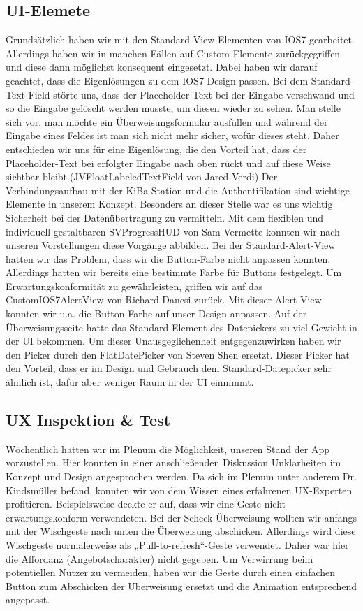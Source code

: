 \subsection{UI-Elemete}
	Grundsätzlich haben wir mit den Standard-View-Elementen von IOS7 gearbeitet. Allerdings haben wir in manchen Fällen auf Custom-Elemente zurückgegriffen und diese dann möglichst konsequent eingesetzt. Dabei haben wir darauf geachtet, dass die Eigenlösungen zu dem IOS7 Design passen. Bei dem Standard-Text-Field störte uns, dass der Placeholder-Text bei der Eingabe verschwand und so die Eingabe gelöscht werden musste, um diesen wieder zu sehen. Man stelle sich vor, man möchte ein Überweisungsformular ausfüllen und während der Eingabe eines Feldes ist man sich nicht mehr sicher, wofür dieses steht. Daher entschieden wir uns für eine Eigenlösung, die den Vorteil hat, dass der Placeholder-Text bei erfolgter Eingabe nach oben rückt und auf diese Weise sichtbar bleibt.(JVFloatLabeledTextField von Jared Verdi)
Der Verbindungsaufbau mit der KiBa-Station und die Authentifikation sind wichtige Elemente in unserem Konzept. Besonders an dieser Stelle war es uns wichtig Sicherheit bei der Datenübertragung zu vermitteln. Mit dem flexiblen und individuell gestaltbaren SVProgressHUD von Sam Vermette konnten wir nach unseren Vorstellungen diese Vorgänge abbilden.
Bei der Standard-Alert-View hatten wir das Problem, dass wir die Button-Farbe nicht anpassen konnten. Allerdings hatten wir bereits eine bestimmte Farbe für Buttons festgelegt. Um Erwartungskonformität zu gewährleisten, griffen wir auf das CustomIOS7AlertView von Richard Dancsi zurück. Mit dieser Alert-View konnten wir u.a. die Button-Farbe auf unser Design anpassen.
Auf der Überweisungsseite hatte das Standard-Element des Datepickers zu viel Gewicht in der UI bekommen. Um dieser Unausgeglichenheit entgegenzuwirken haben wir den Picker durch den FlatDatePicker von Steven Shen ersetzt. Dieser Picker hat den Vorteil, dass er im Design und Gebrauch dem Standard-Datepicker sehr ähnlich ist, dafür aber weniger Raum in der UI einnimmt.
 

\subsection{UX Inspektion \& Test}
	Wöchentlich hatten wir im Plenum die Möglichkeit, unseren Stand der App vorzustellen. Hier konnten in einer anschließenden Diskussion Unklarheiten im Konzept und Design angesprochen werden. Da sich im Plenum unter anderem Dr. Kindsmüller befand, konnten wir von dem Wissen eines erfahrenen UX-Experten profitieren. Beispielsweise deckte er auf, dass wir eine Geste nicht erwartungskonform verwendeten. Bei der Scheck-Überweisung wollten wir anfangs mit der Wischgeste nach unten die Überweisung abschicken. Allerdings wird diese Wischgeste normalerweise als „Pull-to-refresh“-Geste verwendet. Daher war hier die Affordanz (Angebotscharakter) nicht gegeben. Um Verwirrung beim potentiellen Nutzer zu vermeiden, haben wir die Geste durch einen einfachen Button zum Abschicken der Überweisung ersetzt und die Animation entsprechend angepasst.

